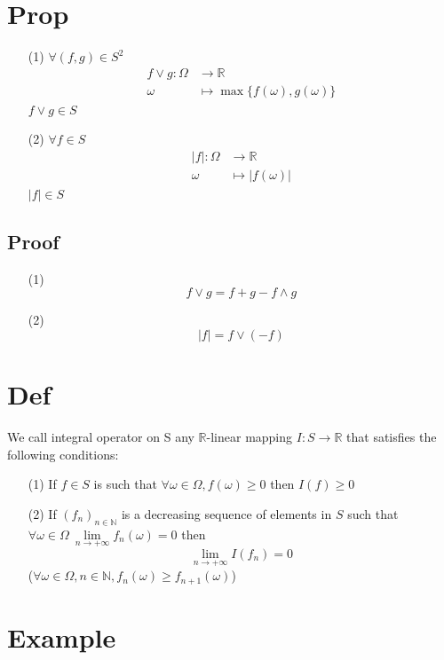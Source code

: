 \documentclass{book}
\newcommand{\abs}[1]{\left\lvert #1 \right\rvert}
\begin{document}
\section{Prop}
\begin{itemize}
    \item [(1)]$\forall(f,g)\in S^2$
$$
\begin{aligned}
    f\vee g:\Omega &\rightarrow \mathbb{R}\\
    \omega &\mapsto\max\{f(\omega),g(\omega)\}
\end{aligned}$$
    $f\vee g\in S$
    \item [(2)]$\forall f\in S$$$\begin{aligned}
        \abs{f}:\Omega &\rightarrow\mathbb{R}\\ \omega &\mapsto \abs{f(\omega)}
    \end{aligned}$$
    $\abs{f}\in S$
\end{itemize}
\subsection*{Proof}
\begin{itemize}
    \item [(1)]$$f\vee g=f+g-f\wedge g$$
    \item [(2)]$$\abs{f}=f\vee(-f)$$
\end{itemize}
\section{Def}
We call integral operator on S any $\mathbb{R}$-linear mapping $I:S\rightarrow\mathbb{R}$ that satisfies the following conditions:
\begin{itemize}
    \item [(1)]If $f\in S$ is such that $\forall \omega\in \Omega,f(\omega)\geq0$ then $I(f)\geq0$
    \item [(2)]If $(f_n)_{n\in \mathbb{N}}$ is  a decreasing sequence of elements in $S$ such that $\forall \omega\in \Omega\ \lim\limits_{n\rightarrow+\infty}f_n(\omega)=0$ then $$\lim\limits_{n\rightarrow+\infty}I(f_n)=0$$
    ($\forall \omega\in \Omega,n\in \mathbb{N},f_n(\omega)\geq f_{n+1}(\omega)$)
\end{itemize}
\section{Example}
\end{document}
